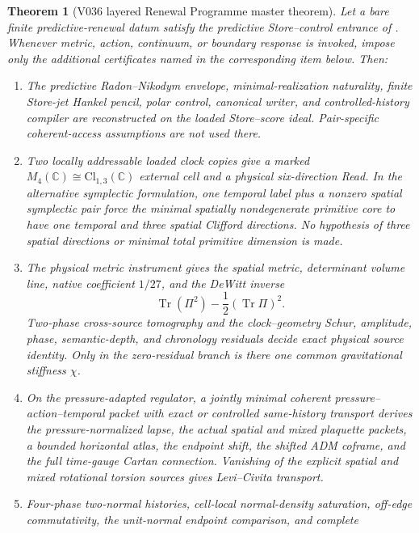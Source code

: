 \documentclass[11pt]{article}
\newtheorem{theorem}{Theorem}[section]
\theoremstyle{definition}
\theoremstyle{remark}
\newcommand{\C}{\mathbb C}
\newcommand{\Tr}{\operatorname{Tr}}
\newcommand{\Cl}{\mathrm{Cl}}
\begin{document}
\begin{theorem}[V036 layered Renewal Programme master theorem]
\label{thm:layered-programme-master}
Let a bare finite predictive-renewal datum satisfy the predictive
Store--control entrance of .  Whenever metric,
action, continuum, or boundary response is invoked, impose only the additional
certificates named in the corresponding item below.  Then:
\begin{enumerate}[label=\textup{(\Roman*)},leftmargin=3em]
\item The predictive Radon--Nikodym envelope, minimal-realization naturality,
      finite Store-jet Hankel pencil, polar control, canonical writer, and
      controlled-history compiler are reconstructed on the loaded
      Store--score ideal.  Pair-specific coherent-access assumptions are not
      used there.
\item Two locally addressable loaded clock copies give a marked
      \(M_4(\C)\cong\Cl_{1,3}(\C)\) external cell and a physical six-direction
      Read.  In the alternative symplectic formulation, one temporal label
      plus a nonzero spatial symplectic pair force the minimal spatially
      nondegenerate primitive core to have one temporal and three spatial
      Clifford directions.  No hypothesis of three spatial directions or
      minimal total primitive dimension is made.
\item The physical metric instrument gives the spatial metric, determinant
      volume line, native coefficient \(1/27\), and the DeWitt inverse
      \[
        \Tr(\Pi^2)-\frac12(\Tr\Pi)^2.
      \]
      Two-phase cross-source tomography and the clock--geometry Schur,
      amplitude, phase, semantic-depth, and chronology residuals decide exact
      physical source identity.  Only in the zero-residual branch is there one
      common gravitational stiffness \(\chi\).
\item On the pressure-adapted regulator, a jointly minimal coherent
      pressure--action--temporal packet with exact or controlled same-history
      transport derives the pressure-normalized lapse, the actual spatial and
      mixed plaquette packets, a bounded horizontal atlas, the endpoint shift,
      the shifted ADM coframe, and the full time-gauge Cartan connection.
      Vanishing of the explicit spatial and mixed rotational torsion sources
      gives Levi--Civita transport.
\item Four-phase two-normal histories, cell-local normal-density saturation,
      off-edge commutativity, the unit-normal endpoint comparison, and complete

\end{enumerate}
\end{theorem}
\end{document}
